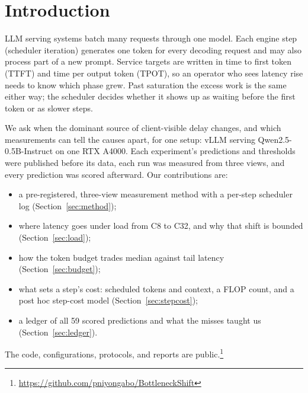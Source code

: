 \section{Introduction}
\label{sec:intro}

LLM serving systems batch many requests through one model. Each engine step (scheduler iteration) generates
one token for every decoding request and may also process part of a new prompt.
Service targets are written in time to first token (TTFT) and time per output token
(TPOT), so an operator who sees latency rise needs to know which phase grew. Past saturation the
excess work is the same either way; the scheduler decides whether it shows up as
waiting before the first token or as slower steps.

We ask when the dominant source of client-visible delay changes, and which
measurements can tell the causes apart, for one setup: vLLM \citep{kwon2023vllm}
serving Qwen2.5-0.5B-Instruct on one RTX A4000. Each experiment's predictions and thresholds
were published before its data, each run was measured from three views, and every
prediction was scored afterward. Our contributions are:
\begin{itemize}
  \item a pre-registered, three-view measurement method with a per-step scheduler log
    (Section~\ref{sec:method});
  \item where latency goes under load from C8 to C32, and why that shift is bounded
    (Section~\ref{sec:load});
  \item how the token budget trades median against tail latency
    (Section~\ref{sec:budget});
  \item what sets a step's cost: scheduled tokens and context, a FLOP count, and a
    post hoc step-cost model (Section~\ref{sec:stepcost});
  \item a ledger of all 59 scored predictions and what the misses taught us
    (Section~\ref{sec:ledger}).
\end{itemize}
The code, configurations, protocols, and reports are public.\footnote{\url{https://github.com/pniyongabo/BottleneckShift}}

